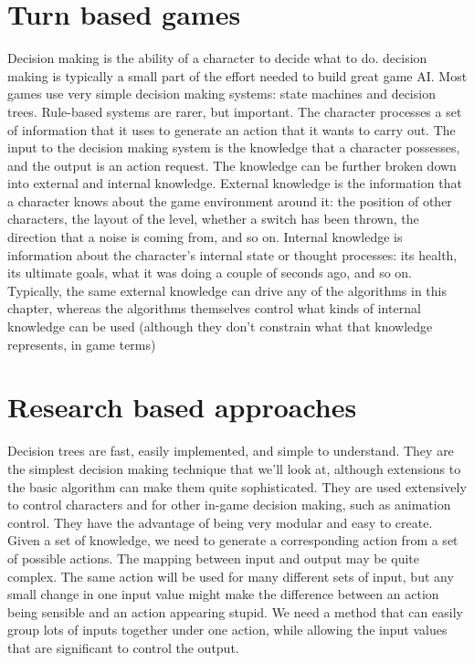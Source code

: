 \documentclass[12pt]{report}
\begin{document}
\section{Turn based games}
Decision making is the ability of a character to decide what to do.
decision making is typically a small part of the effort needed to build great game
AI. Most games use very simple decision making systems: state machines and decision trees.
Rule-based systems are rarer, but important.
The character processes a set of information that it uses to generate an action that it wants to
carry out. The input to the decision making system is the knowledge that a character possesses,
and the output is an action request. The knowledge can be further broken down into external
and internal knowledge. External knowledge is the information that a character knows about the
game environment around it: the position of other characters, the layout of the level, whether a
switch has been thrown, the direction that a noise is coming from, and so on. Internal knowledge
is information about the character’s internal state or thought processes: its health, its ultimate
goals, what it was doing a couple of seconds ago, and so on.
Typically, the same external knowledge can drive any of the algorithms in this chapter, whereas
the algorithms themselves control what kinds of internal knowledge can be used (although they
don’t constrain what that knowledge represents, in game terms)
\section{Research based approaches}
Decision trees are fast, easily implemented, and simple to understand. They are the simplest
decision making technique that we’ll look at, although extensions to the basic algorithm can make
them quite sophisticated. They are used extensively to control characters and for other in-game
decision making, such as animation control.
They have the advantage of being very modular and easy to create.
Given a set of knowledge, we need to generate a corresponding action from a set of possible
actions.
The mapping between input and output may be quite complex. The same action will be used
for many different sets of input, but any small change in one input value might make the difference
between an action being sensible and an action appearing stupid.
We need a method that can easily group lots of inputs together under one action, while
allowing the input values that are significant to control the output.
\end{document}
